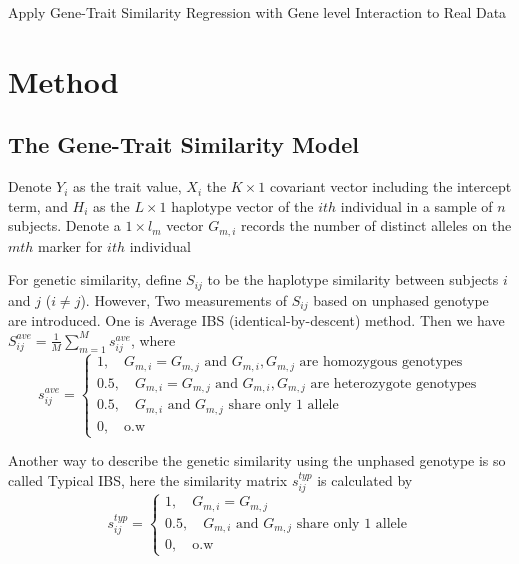 \documentclass{article}
\begin{document}
    \begin{center}
        \Large{Apply Gene-Trait Similarity Regression with Gene level Interaction to Real Data}
    \end{center}

    \fontsize{11pt}{\baselineskip}\selectfont

    \section{Method}

        \subsection{The Gene-Trait Similarity Model}
         Denote $Y_i$ as the trait value, $X_i$ the $K\times 1$ covariant vector including the intercept term, and $H_i$ as the $L\times1$ haplotype vector of the $ith$ individual in a sample of $n$ subjects. Denote a $1\times l_m$ vector $G_{m,i}$ records the number of distinct alleles on the $mth$ marker for $ith$ individual

         For genetic similarity, define $S_{ij}$ to be the haplotype similarity between subjects $i$ and $j$ ($i\neq j$). However, Two measurements of $S_{ij}$ based on unphased genotype are introduced. One is Average IBS (identical-by-descent) method. Then we have $S^{ave}_{ij}=\frac{1}{M}\sum^M_{m=1}s^{ave}_{ij}$, where
         \[ s^{ave}_{ij}=\begin{cases}
                1,\quad G_{m,i}=G_{m,j} \mbox{ and } G_{m,i},G_{m,j} \mbox{ are homozygous genotypes} \\
                0.5,\quad G_{m,i}=G_{m,j} \mbox{ and } G_{m,i},G_{m,j} \mbox{ are heterozygote genotypes} \\
                0.5,\quad G_{m,i} \mbox{ and } G_{m,j} \mbox{ share only 1 allele} \\
                0,\quad \mbox{o.w}
         \end{cases} \]

         Another way to describe the genetic similarity using the unphased genotype is so called Typical IBS, here the similarity matrix $s_{ij}^{typ}$ is calculated by
         \[ s^{typ}_{ij}=\begin{cases}
                1,\quad G_{m,i}=G_{m,j}\\
                0.5,\quad G_{m,i} \mbox{ and } G_{m,j} \mbox{ share only 1 allele} \\
                0,\quad \mbox{o.w}
         \end{cases} \]
\end{document}
